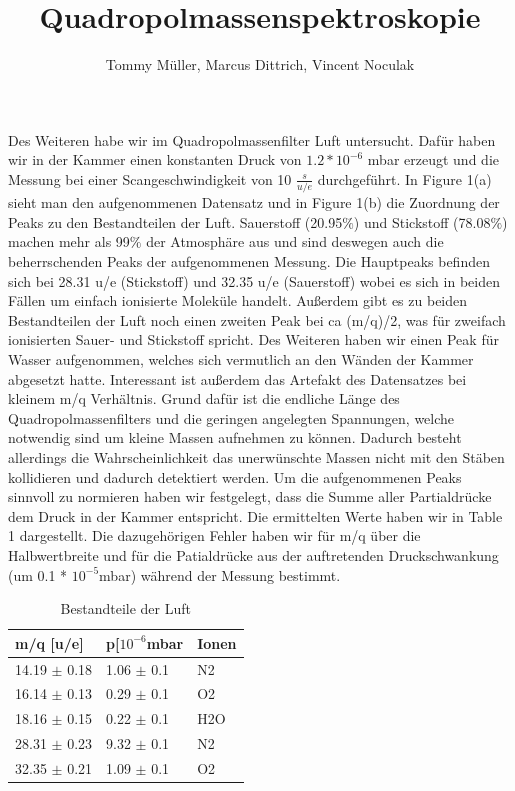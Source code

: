 \documentclass[10pt,a4paper]{article}
\author{Tommy Müller, Marcus Dittrich, Vincent Noculak}
\title{Quadropolmassenspektroskopie}
\begin{document}
Des Weiteren habe wir im Quadropolmassenfilter Luft untersucht. Dafür haben wir in der Kammer einen konstanten Druck von $1.2 * 10^{-6}$ mbar erzeugt und die Messung bei einer Scangeschwindigkeit von 10 $\frac{s}{u/e}$ durchgeführt. In Figure 1(a) sieht man den aufgenommenen Datensatz und in Figure 1(b) die Zuordnung der Peaks zu den Bestandteilen der Luft. Sauerstoff (20.95$\%$) und Stickstoff (78.08$\%$)  machen mehr als 99$\%$ der Atmosphäre aus und sind deswegen auch die beherrschenden Peaks der aufgenommenen Messung. Die Hauptpeaks befinden sich bei 28.31 u/e (Stickstoff) und 32.35 u/e (Sauerstoff) wobei es sich in beiden Fällen um einfach ionisierte Moleküle handelt. Außerdem gibt es zu beiden Bestandteilen der Luft noch einen zweiten Peak bei ca (m/q)/2, was für zweifach ionisierten Sauer- und Stickstoff spricht. Des Weiteren haben wir einen Peak für Wasser aufgenommen, welches sich vermutlich an den Wänden der Kammer abgesetzt hatte. Interessant ist außerdem das Artefakt des Datensatzes bei kleinem m/q Verhältnis. Grund dafür ist die endliche Länge des Quadropolmassenfilters und die geringen angelegten Spannungen, welche notwendig sind um kleine Massen aufnehmen zu können. Dadurch besteht allerdings die Wahrscheinlichkeit das unerwünschte Massen nicht mit den Stäben kollidieren und dadurch detektiert werden. Um die aufgenommenen Peaks sinnvoll zu normieren haben wir festgelegt, dass die Summe aller Partialdrücke dem Druck in der Kammer entspricht. Die ermittelten Werte haben wir in Table 1 dargestellt. Die dazugehörigen Fehler haben wir für m/q über die Halbwertbreite und für die Patialdrücke aus der auftretenden Druckschwankung (um 0.1 * $10^{-5}$mbar) während der Messung bestimmt. 

\begin{table}[k]
	\centering
	\caption{Bestandteile der Luft}
	\label{my-label}
	\begin{tabular}{|l|l|l|}
		\hline
		m/q {[}u/e{]} & p{[}$10^{-6}$mbar & Ionen \\ \hline
		14.19 $\pm$ 0.18       & 1.06  $\pm$ 0.1    & N2    \\ \hline
		16.14 $\pm$ 0.13       & 0.29  $\pm$ 0.1    & O2    \\ \hline
		18.16 $\pm$ 0.15       & 0.22  $\pm$ 0.1    & H2O   \\ \hline
		28.31 $\pm$ 0.23       & 9.32  $\pm$ 0.1    & N2    \\ \hline
		32.35 $\pm$ 0.21       & 1.09  $\pm$ 0.1    & O2    \\ \hline
	\end{tabular}
\end{table}
\end{document}
